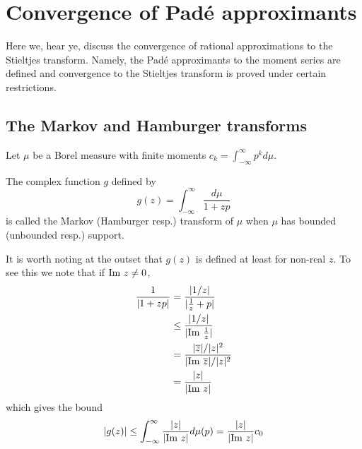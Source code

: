 

\chapter{Convergence of Pad\'e approximants}{}

Here we, hear ye, discuss the convergence of rational approximations to the Stieltjes transform. Namely, the Pad\'e approximants to the moment series are defined and convergence to the Stieltjes transform is proved under certain restrictions.

\section{The Markov and Hamburger transforms}

Let $\mu$ be a Borel measure with finite moments $c_k = \int_{-\infty}^\infty p^k d\mu$. 

\begin{definition}
  The complex function $g$ defined by
  \[
    g(z) = \int_{-\infty}^\infty\frac{d\mu}{1+zp}
  \]
  is called the Markov (Hamburger resp.) transform of $\mu$ when $\mu$ has bounded (unbounded resp.) support.
\end{definition}

It is worth noting at the outset that $g(z)$ is defined at least for non-real $z$. To see this we note that if $\text{Im}~ z \neq 0$,
\begin{align*}
  \frac1{|1 + zp|} 
  &= \frac{|1/z|}{|\frac1z + p|} \\
  &\leq \frac{|1/z|}{|\text{Im}~ \frac1z|} \\
  &= \frac{|\overline{z}|/|z|^2}{|\text{Im}~ \overline{z}|/|z|^2} \\
  &= \frac{|z|}{|\text{Im}~ z|}
\end{align*}
which gives the bound
\begin{equation}
  |g(z)| 
  \leq \int_{-\infty}^\infty \frac{|z|}{|\text{Im}~ z|} d\mu(p) 
  = \frac{|z|}{|\text{Im}~ z|}c_0
\end{equation}

